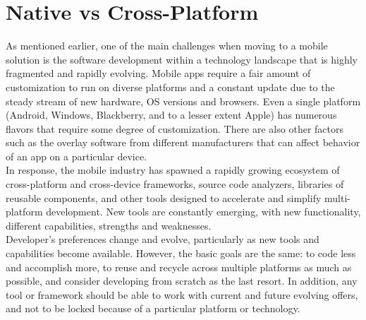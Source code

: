 \section{Native vs Cross-Platform}
As mentioned earlier, one of the main challenges when moving to a mobile solution is the software development within a technology landscape that is highly fragmented and rapidly evolving. Mobile apps require a fair amount of customization to run on diverse platforms and a constant update due to the steady stream of new hardware, OS versions and browsers. Even a single platform (Android, Windows, Blackberry, and to a lesser extent Apple) has numerous flavors that require some degree of customization. There are also other factors such as the overlay software from different manufacturers that can affect behavior of an app on a particular device.\\
In response, the mobile industry has spawned a rapidly growing ecosystem of cross-platform and cross-device frameworks, source code analyzers, libraries of reusable components, and other tools designed to accelerate and simplify multi-platform development. New tools are constantly emerging, with new functionality, different capabilities,  strengths and weaknesses.\\
Developer’s preferences change and evolve, particularly as new tools and capabilities become available. However, the basic goals are the same: to code less and accomplish more, to reuse and recycle across multiple platforms as much as possible, and consider developing from scratch as the last resort. In addition, any tool or framework should be able to work with current and future evolving offers, and not to be locked because of a particular platform or technology.\cite{ref7}
